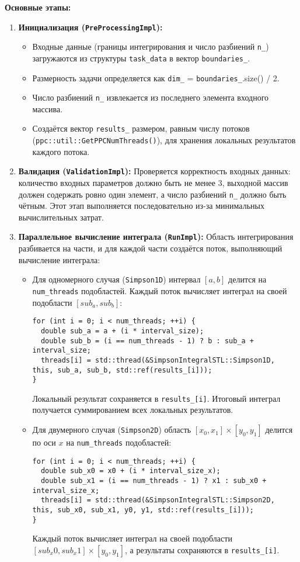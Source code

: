 \documentclass[12pt]{article}
\begin{document}
\textbf{Основные этапы:}
\begin{enumerate}
  \item \textbf{Инициализация (\texttt{PreProcessingImpl}):}
  \begin{itemize}
    \item Входные данные (границы интегрирования и число разбиений \texttt{n\_}) загружаются из структуры \texttt{task\_data} в вектор \texttt{boundaries\_}.
    \item Размерность задачи определяется как \texttt{dim\_} = \texttt{boundaries\_}.size() / 2.
    \item Число разбиений \texttt{n\_} извлекается из последнего элемента входного массива.
    \item Создаётся вектор \texttt{results\_} размером, равным числу потоков (\texttt{ppc::util::GetPPCNumThreads()}), для хранения локальных результатов каждого потока.
  \end{itemize}

  \item \textbf{Валидация (\texttt{ValidationImpl}):}
  Проверяется корректность входных данных: количество входных параметров должно быть не менее 3, выходной массив должен содержать ровно один элемент, а число разбиений \texttt{n\_} должно быть чётным. Этот этап выполняется последовательно из-за минимальных вычислительных затрат.

  \item \textbf{Параллельное вычисление интеграла (\texttt{RunImpl}):}
  Область интегрирования разбивается на части, и для каждой части создаётся поток, выполняющий вычисление интеграла:
  \begin{itemize}
    \item Для одномерного случая (\texttt{Simpson1D}) интервал $[a, b]$ делится на \texttt{num\_threads} подобластей. Каждый поток вычисляет интеграл на своей подобласти $[sub_a, sub_b]$:
    \begin{lstlisting}
for (int i = 0; i < num_threads; ++i) {
  double sub_a = a + (i * interval_size);
  double sub_b = (i == num_threads - 1) ? b : sub_a + interval_size;
  threads[i] = std::thread(&SimpsonIntegralSTL::Simpson1D, this, sub_a, sub_b, std::ref(results_[i]));
}
    \end{lstlisting}
    Локальный результат сохраняется в \texttt{results\_[i]}. Итоговый интеграл получается суммированием всех локальных результатов.

    \item Для двумерного случая (\texttt{Simpson2D}) область $[x_0, x_1] \times [y_0, y_1]$ делится по оси $x$ на \texttt{num\_threads} подобластей:
    \begin{lstlisting}
for (int i = 0; i < num_threads; ++i) {
  double sub_x0 = x0 + (i * interval_size_x);
  double sub_x1 = (i == num_threads - 1) ? x1 : sub_x0 + interval_size_x;
  threads[i] = std::thread(&SimpsonIntegralSTL::Simpson2D, this, sub_x0, sub_x1, y0, y1, std::ref(results_[i]));
}
    \end{lstlisting}
    Каждый поток вычисляет интеграл на своей подобласти $[sub_x0, sub_x1] \times [y_0, y_1]$, а результаты сохраняются в \texttt{results\_[i]}.


\end{itemize}
\end{enumerate}
\end{document}
